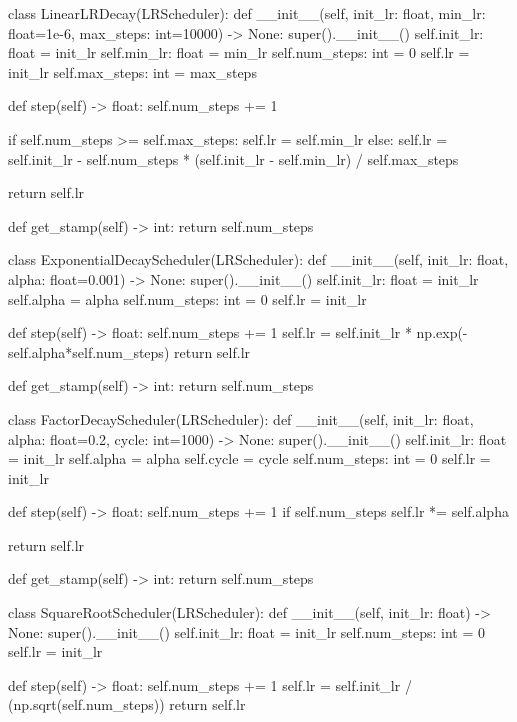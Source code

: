\documentclass[14pt, a4paper]{article}
\theoremstyle{sltheorem}
\theoremstyle{soltheorem}
\begin{document}
\begin{python}
    

class LinearLRDecay(LRScheduler):
    def __init__(self, init_lr: float, min_lr: float=1e-6, max_steps: int=10000) -> None:
        super().__init__()
        self.init_lr: float = init_lr
        self.min_lr: float = min_lr
        self.num_steps: int = 0
        self.lr = init_lr
        self.max_steps: int = max_steps
        
    
    def step(self) -> float:
        self.num_steps += 1
        
        if self.num_steps >= self.max_steps:
            self.lr = self.min_lr
        else:
            self.lr = self.init_lr - self.num_steps * (self.init_lr - self.min_lr) / self.max_steps
            
        return self.lr
    
    
    def get_stamp(self) -> int:
        return self.num_steps
    
    
class ExponentialDecayScheduler(LRScheduler):
    def __init__(self, init_lr: float, alpha: float=0.001) -> None:
        super().__init__()
        self.init_lr: float = init_lr
        self.alpha = alpha
        self.num_steps: int = 0
        self.lr = init_lr
        
        
    def step(self) -> float:
        self.num_steps += 1
        self.lr = self.init_lr * np.exp(-self.alpha*self.num_steps)
        return self.lr
    
    
    def get_stamp(self) -> int:
        return self.num_steps
    
    
class FactorDecayScheduler(LRScheduler):
    def __init__(self, init_lr: float, alpha: float=0.2, cycle: int=1000) -> None:
        super().__init__()
        self.init_lr: float = init_lr
        self.alpha = alpha
        self.cycle = cycle
        self.num_steps: int = 0
        self.lr = init_lr
        
    def step(self) -> float:
        self.num_steps += 1
        if self.num_steps %
            self.lr *= self.alpha
        
        return self.lr
    
    def get_stamp(self) -> int:
        return self.num_steps
    

class SquareRootScheduler(LRScheduler):
    def __init__(self, init_lr: float) -> None:
        super().__init__()
        self.init_lr: float = init_lr
        self.num_steps: int = 0
        self.lr = init_lr
        
        
    def step(self) -> float:
        self.num_steps += 1
        self.lr = self.init_lr / (np.sqrt(self.num_steps))
        return self.lr
    

\end{python}
\end{document}
